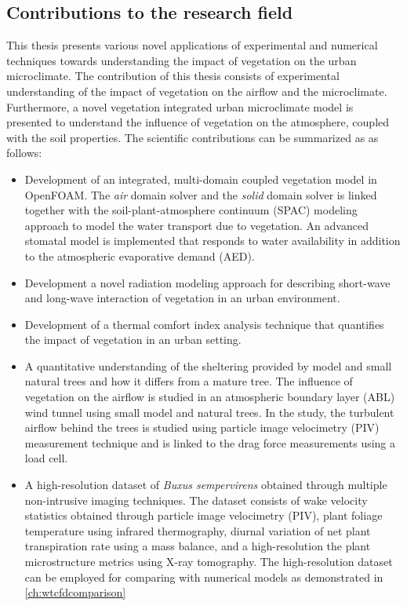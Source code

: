 \subsection{Contributions to the research field}

This thesis presents various novel applications of experimental and numerical techniques towards understanding the impact of vegetation on the urban microclimate. The contribution of this thesis consists of experimental understanding of the impact of vegetation on the airflow and the microclimate. Furthermore, a novel vegetation integrated urban microclimate model is presented to understand the influence of vegetation on the atmosphere, coupled with the soil properties. The scientific contributions can be summarized as as follows:

\begin{itemize}
	\item Development of an integrated, multi-domain coupled vegetation model in OpenFOAM. The \textit{air} domain solver and the \textit{solid} domain solver is linked together with the soil-plant-atmosphere continuum (SPAC) modeling approach to model the water transport due to vegetation. An advanced stomatal model is implemented that responds to water availability in addition to the atmospheric evaporative demand (AED).
	
	\item Development a novel radiation modeling approach for describing short-wave and long-wave interaction of vegetation in an urban environment.
	
	\item Development of a thermal comfort index analysis technique that quantifies the impact of vegetation in an urban setting.

	\item A quantitative understanding of the sheltering provided by model and small natural trees and how it differs from a mature tree. The influence of vegetation on the airflow is studied in an atmospheric boundary layer (ABL) wind tunnel using small model and natural trees. In the study, the turbulent airflow behind the trees is studied using particle image velocimetry (PIV) measurement technique and is linked to the drag force measurements using a load cell. 
	
	\item A high-resolution dataset of \textit{Buxus sempervirens} obtained through multiple non-intrusive imaging techniques. The dataset consists of wake velocity statistics obtained through particle image velocimetry (PIV), plant foliage temperature using infrared thermography, diurnal variation of net plant transpiration rate using a mass balance, and a high-resolution the plant microstructure metrics using  X-ray tomography. The high-resolution dataset can be employed for comparing with numerical models as demonstrated in \cref{ch:wtcfdcomparison}


\end{itemize}
